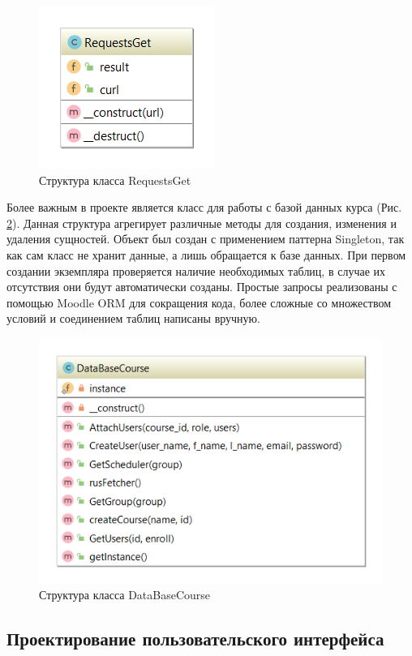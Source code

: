 \documentclass[a4paper,14pt]{article}
\begin{document}
\begin{figure}[H]
	\centering		
	\includegraphics{image/RequestsGet}
	\caption{Структура класса RequestsGet}\label{img:request_class}
\end{figure}

Более важным в проекте является класс для работы с базой данных курса (Рис. \ref{img:db_class}). 
Данная структура агрегирует различные методы для создания, изменения и удаления сущностей.
Объект был создан с применением паттерна Singleton, так как сам класс не хранит данные, а лишь обращается к базе данных.
При первом создании экземпляра проверяется наличие необходимых таблиц, в случае их отсутствия они будут автоматически созданы.
Простые запросы реализованы с помощью Moodle ORM для сокращения кода, более сложные со множеством условий и соединением таблиц написаны вручную.


\begin{figure}[H]
	\centering		
	\includegraphics[width=0.7\linewidth]{image/DataBaseClass}
	\caption{Структура класса DataBaseCourse}\label{img:db_class}
\end{figure}

\subsection{Проектирование пользовательского интерфейса}
\end{document}
